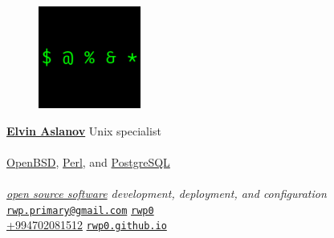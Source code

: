 \documentclass[10pt, oneside, final]{article}
\begin{document}
  \thispagestyle{empty}
  \begin{figure}
  \includegraphics[width = 0.3\textwidth]{business_card.png}
  \end{figure}
  \underline{\large\textsf{\textbf{Elvin Aslanov}}}
  {Unix specialist} \\
  \\
  {\href{https://openbsd.org/}{OpenBSD}, \href{https://perl.org/}{Perl}, and \href{https://postgresql.org/}{PostgreSQL}} \\
  \\
  \emph{\href{https://en.wikipedia.org/wiki/Open-source_software}{open source software} development, deployment, and configuration}
  \vfill 
  {\faEnvelope} \texttt{\href{mailto:rwp.primary@gmail.com}{rwp.primary@gmail.com}} \hfill 
  {\faGithub} \texttt{\href{https://github.com/rwp0}{rwp0}} \\
  {\faPhone} \href{tel:+994702081512}{+994{\textendash}70{\textendash}208{\textendash}15{\textendash}12} \hfill
  {\faGlobe} \texttt{\href{https://rwp0.github.io/}{rwp0.github.io}}
\end{document}
